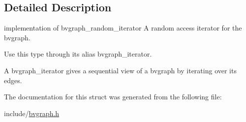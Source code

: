 \subsection{Detailed Description}
implementation of bvgraph\+\_\+random\+\_\+iterator A random access iterator for the bvgraph. 

Use this type through its alias bvgraph\+\_\+iterator.

A bvgraph\+\_\+iterator gives a sequential view of a bvgraph by iterating over its edges. 

The documentation for this struct was generated from the following file\+:\begin{DoxyCompactItemize}
\item 
include/\hyperlink{bvgraph_8h}{bvgraph.\+h}\end{DoxyCompactItemize}
